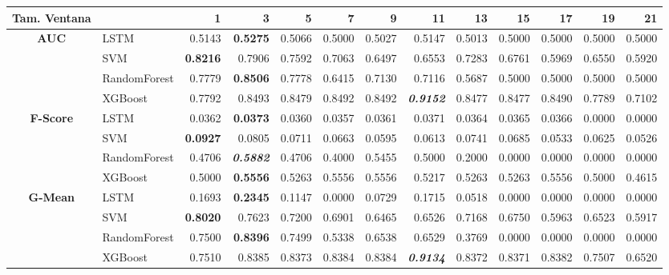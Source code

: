 \begin{table}[H]
	\centering
	\begin{adjustbox}{max width=14cm}
		\begin{tabular}{|c|l|r|r|r|r|r|r|r|r|r|r|r|}
			\hline
			\textbf{Tam. Ventana} &         &      1  &      3  &      5  &      7  &      9  &      11 &      13 &      15 &      17 &      19 &      21 \\
			\hline
			\textbf{AUC} &  LSTM &  0.5143 & \textbf{  0.5275 } &  0.5066 &  0.5000 &  0.5027 &  0.5147 &  0.5013 &  0.5000 &  0.5000 &  0.5000 &  0.5000 \\
			&  SVM & \textbf{  0.8216 } &  0.7906 &  0.7592 &  0.7063 &  0.6497 &  0.6553 &  0.7283 &  0.6761 &  0.5969 &  0.6550 &  0.5920 \\
			&  RandomForest &  0.7779 & \textbf{  0.8506 } &  0.7778 &  0.6415 &  0.7130 &  0.7116 &  0.5687 &  0.5000 &  0.5000 &  0.5000 &  0.5000 \\
			&  XGBoost &  0.7792 &  0.8493 &  0.8479 &  0.8492 &  0.8492 & \textit{ \textbf{  0.9152 } } &  0.8477 &  0.8477 &  0.8490 &  0.7789 &  0.7102 \\
			\hline
			\textbf{F-Score} &  LSTM &  0.0362 & \textbf{  0.0373 } &  0.0360 &  0.0357 &  0.0361 &  0.0371 &  0.0364 &  0.0365 &  0.0366 &  0.0000 &  0.0000 \\
			&  SVM & \textbf{  0.0927 } &  0.0805 &  0.0711 &  0.0663 &  0.0595 &  0.0613 &  0.0741 &  0.0685 &  0.0533 &  0.0625 &  0.0526 \\
			&  RandomForest &  0.4706 & \textit{ \textbf{  0.5882 } } &  0.4706 &  0.4000 &  0.5455 &  0.5000 &  0.2000 &  0.0000 &  0.0000 &  0.0000 &  0.0000 \\
			&  XGBoost &  0.5000 & \textbf{  0.5556 } &  0.5263 &  0.5556 &  0.5556 &  0.5217 &  0.5263 &  0.5263 &  0.5556 &  0.5000 &  0.4615 \\
			\hline
			\textbf{G-Mean} &  LSTM &  0.1693 & \textbf{  0.2345 } &  0.1147 &  0.0000 &  0.0729 &  0.1715 &  0.0518 &  0.0000 &  0.0000 &  0.0000 &  0.0000 \\
			&  SVM & \textbf{  0.8020 } &  0.7623 &  0.7200 &  0.6901 &  0.6465 &  0.6526 &  0.7168 &  0.6750 &  0.5963 &  0.6523 &  0.5917 \\
			&  RandomForest &  0.7500 & \textbf{  0.8396 } &  0.7499 &  0.5338 &  0.6538 &  0.6529 &  0.3769 &  0.0000 &  0.0000 &  0.0000 &  0.0000 \\
			&  XGBoost &  0.7510 &  0.8385 &  0.8373 &  0.8384 &  0.8384 & \textit{ \textbf{  0.9134 } } &  0.8372 &  0.8371 &  0.8382 &  0.7507 &  0.6520 \\

\end{tabular}
\end{adjustbox}
\end{table}
